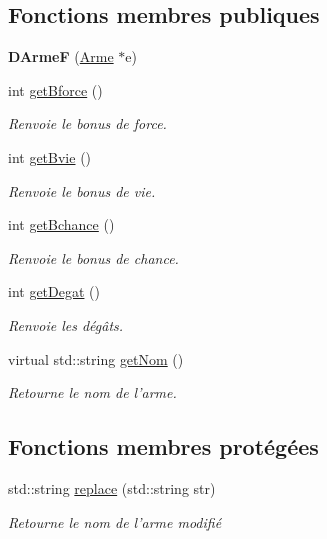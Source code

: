 \subsection*{Fonctions membres publiques}
\begin{DoxyCompactItemize}
\item 
\hypertarget{class_d_arme_f_a88e1d0ca6143fb0a00114a41ebcb7783}{{\bfseries D\-Arme\-F} (\hyperlink{class_arme}{Arme} $\ast$e)}\label{class_d_arme_f_a88e1d0ca6143fb0a00114a41ebcb7783}

\item 
int \hyperlink{class_d_arme_a76075bcbe61b20bd0e21e2d06fe33ab7}{get\-Bforce} ()
\begin{DoxyCompactList}\small\item\em Renvoie le bonus de force. \end{DoxyCompactList}\item 
int \hyperlink{class_d_arme_a91b3a3100969a568a8408ba098668398}{get\-Bvie} ()
\begin{DoxyCompactList}\small\item\em Renvoie le bonus de vie. \end{DoxyCompactList}\item 
int \hyperlink{class_d_arme_ad50d376b08d62276b7cf50d2cd59d619}{get\-Bchance} ()
\begin{DoxyCompactList}\small\item\em Renvoie le bonus de chance. \end{DoxyCompactList}\item 
int \hyperlink{class_d_arme_a7396e865674067f4f21a28e6babc0fad}{get\-Degat} ()
\begin{DoxyCompactList}\small\item\em Renvoie les dégâts. \end{DoxyCompactList}\item 
virtual std\-::string \hyperlink{class_arme_ab1b18cfa41fac19fccedf2165b9ff33c}{get\-Nom} ()
\begin{DoxyCompactList}\small\item\em Retourne le nom de l'arme. \end{DoxyCompactList}\end{DoxyCompactItemize}
\subsection*{Fonctions membres protégées}
\begin{DoxyCompactItemize}
\item 
std\-::string \hyperlink{class_d_arme_a604caa7ee656dab58d15b7cf86863e3d}{replace} (std\-::string str)
\begin{DoxyCompactList}\small\item\em Retourne le nom de l'arme modifié \end{DoxyCompactList}\end{DoxyCompactItemize}
